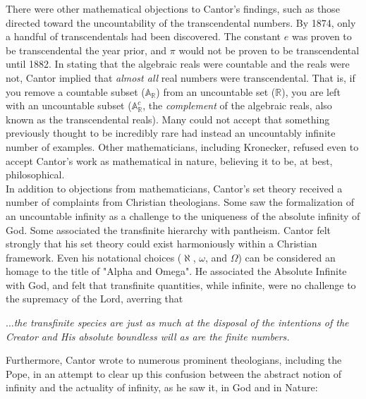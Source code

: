 \begin{tcolorbox}[breakable, enhanced, colback=textbook-blue, sharp corners]
	There were other mathematical objections to Cantor's findings, such as those directed toward the uncountability of the transcendental numbers. By 1874, only a handful of transcendentals had been discovered. The constant $e$ was proven to be transcendental the year prior, and $\pi$ would not be proven to be transcendental until 1882. In stating that the algebraic reals were countable and the reals were not, Cantor implied that \textit{almost all} real numbers were transcendental. That is, if you remove a countable subset ($\mathbb{A}_\mathbb{R}$) from an uncountable set ($\mathbb{R}$), you are left with an uncountable subset ($\mathbb{A}_\mathbb{R}^c$, the \textit{complement} of the algebraic reals, also known as the transcendental reals). Many could not accept that something previously thought to be incredibly rare had instead an uncountably infinite number of examples. Other mathematicians, including Kronecker, refused even to accept Cantor's work as mathematical in nature, believing it to be, at best, philosophical. \\
	
	In addition to objections from mathematicians, Cantor's set theory received a number of complaints from Christian theologians. Some saw the formalization of an uncountable infinity as a challenge to the uniqueness of the absolute infinity of God. Some associated the transfinite hierarchy with pantheism. Cantor felt strongly that his set theory could exist harmoniously within a Christian framework. Even his notational choices ($\aleph$, $\omega$, and $\Omega$) can be considered an homage to the title of "Alpha and Omega". He associated the Absolute Infinite with God, and felt that transfinite quantities, while infinite, were no challenge to the supremacy of the Lord, averring that \\
	
	\begin{displayquote}
		$\dots$\textit{the transfinite species are just as much at the disposal of the intentions of the Creator and His absolute boundless will as are the finite numbers.}
	\end{displayquote}
	\vspace{4mm}
	
	Furthermore, Cantor wrote to numerous prominent theologians, including the Pope, in an attempt to clear up this confusion between the abstract notion of infinity and the actuality of infinity, as he saw it, in God and in Nature: \\
	

\end{tcolorbox}
